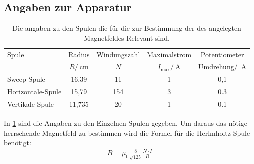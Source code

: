 \newpage
\subsection{Angaben zur Apparatur}
\begin{table}[h!]
	\centering
	\begin{tabular}{l c c c c}
	\toprule
	Spule & Radius & Windungszahl & Maximalstrom & Potentiometer\\
	& $R/\SI{}{\centi\meter}$ & $N$ & $I_\text{max}/\SI{}{\ampere}$ & Umdrehung/\SI{}{\ampere}\\\midrule
	Sweep-Spule & 16,39 & 11 & 1 & 0,1\\
	Horizontale-Spule & 15,79 & 154 & 3 & 0.3\\
	Vertikale-Spule & 11,735 & 20 & 1 & 0.1\\
	\bottomrule
	\end{tabular}
	\caption{Die angaben zu den Spulen die für die zur Bestimmung der des angelegten Magnetfeldes Relevant sind.\cite{V21}}\label{tab:Apparatur}
\end{table}
In \cref{tab:Apparatur} sind die Angaben zu den Einzelnen Spulen gegeben.
Um daraus das nötige herrschende Magnetfeld zu bestimmen wird die Formel für die Herlmholtz-Spule benötigt:
\begin{align}
	B=\mu_0\frac{8}{\sqrt{125}}\frac{N\cdot I}{R}
\end{align}